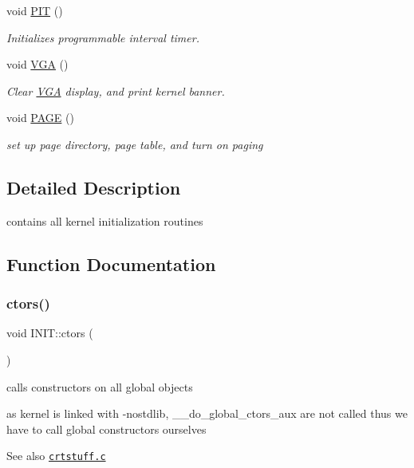 \begin{DoxyCompactItemize}
void \hyperlink{namespace_i_n_i_t_a6fa46ed9b50062458ede3692a4865c51}{P\+IT} ()
\begin{DoxyCompactList}\small\item\em Initializes programmable interval timer. \end{DoxyCompactList}\item 
void \hyperlink{namespace_i_n_i_t_abae5789d80f8edd37455f3b167779654}{V\+GA} ()
\begin{DoxyCompactList}\small\item\em Clear \hyperlink{namespace_v_g_a}{V\+GA} display, and print kernel banner. \end{DoxyCompactList}\item 
void \hyperlink{namespace_i_n_i_t_aea383d3de30095cf9d176fa60b66d01d}{P\+A\+GE} ()
\begin{DoxyCompactList}\small\item\em set up page directory, page table, and turn on paging \end{DoxyCompactList}\end{DoxyCompactItemize}


\subsection{Detailed Description}
contains all kernel initialization routines 

\subsection{Function Documentation}
\mbox{\label{namespace_i_n_i_t_a6608557e41ad37cdb4a408e2f05c9783}} 
\subsubsection{\texorpdfstring{ctors()}{ctors()}}
{\footnotesize\ttfamily void I\+N\+I\+T\+::ctors (\begin{DoxyParamCaption}{ }\end{DoxyParamCaption})}



calls constructors on all global objects 

as kernel is linked with -\/nostdlib, \+\_\+\+\_\+do\+\_\+global\+\_\+ctors\+\_\+aux are not called thus we have to call global constructors ourselves

\begin{DoxySeeAlso}{See also}
\href{https://github.com/gcc-mirror/gcc/blob/master/libgcc/crtstuff.c}{\tt crtstuff.\+c} 
\end{DoxySeeAlso}


